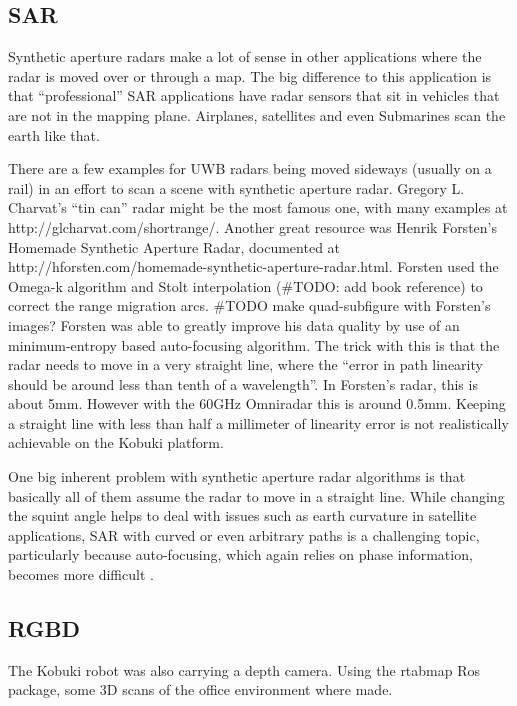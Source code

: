 \subsection{SAR}\label{sar-1}

Synthetic aperture radars make a lot of sense in other applications
where the radar is moved over or through a map. The big difference to
this application is that ``professional'' SAR applications have radar
sensors that sit in vehicles that are not in the mapping plane.
Airplanes, satellites and even Submarines scan the earth like that.

There are a few examples for UWB radars being moved sideways (usually on
a rail) in an effort to scan a scene with synthetic aperture radar.
Gregory L. Charvat's ``tin can'' radar \cite{Charvat2014} might be the
most famous one, with many examples at http://glcharvat.com/shortrange/.
Another great resource was Henrik Forsten's Homemade Synthetic Aperture
Radar, documented at
http://hforsten.com/homemade-synthetic-aperture-radar.html. Forsten used
the Omega-k algorithm \cite{Tolman2008} and Stolt interpolation (\#TODO:
add book reference) to correct the range migration arcs. \#TODO make
quad-subfigure with Forsten's images? Forsten was able to greatly
improve his data quality by use of an minimum-entropy based
auto-focusing algorithm. The trick with this is that the radar needs to
move in a very straight line, where the ``error in path linearity should
be around less than tenth of a wavelength''. In Forsten's radar, this is
about 5mm. However with the 60GHz Omniradar this is around 0.5mm.
Keeping a straight line with less than half a millimeter of linearity
error is not realistically achievable on the Kobuki platform.



One big inherent problem with synthetic aperture radar algorithms is
that basically all of them assume the radar to move in a straight line.
While changing the squint angle helps to deal with issues such as earth
curvature in satellite applications, SAR with curved or even arbitrary
paths is a challenging topic, particularly because auto-focusing, which
again relies on phase information, becomes more difficult
\cite{Axelsson2002}.

\subsection{RGBD}\label{rgbd-1}

The Kobuki robot was also carrying a depth camera. Using the rtabmap Ros
package, some 3D scans of the office environment where made.

